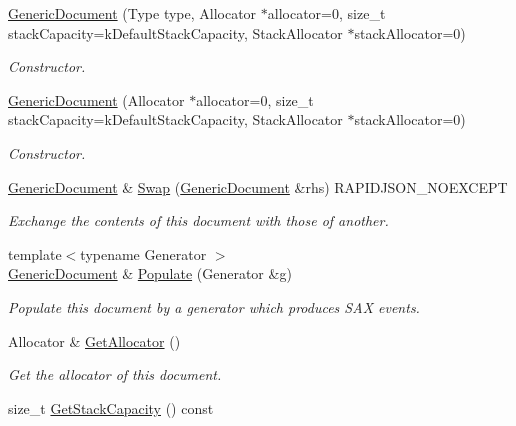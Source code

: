 \begin{DoxyCompactItemize}
\item 
\hyperlink{class_generic_document_a3da21e72ec8f26b9da77d86cc1d41cdd}{Generic\+Document} (Type type, Allocator $\ast$allocator=0, size\+\_\+t stack\+Capacity=k\+Default\+Stack\+Capacity, Stack\+Allocator $\ast$stack\+Allocator=0)
\begin{DoxyCompactList}\small\item\em Constructor. \end{DoxyCompactList}\item 
\hyperlink{class_generic_document_a6b1c313ad538cafc4d23d4bd5f97178c}{Generic\+Document} (Allocator $\ast$allocator=0, size\+\_\+t stack\+Capacity=k\+Default\+Stack\+Capacity, Stack\+Allocator $\ast$stack\+Allocator=0)
\begin{DoxyCompactList}\small\item\em Constructor. \end{DoxyCompactList}\item 
\hyperlink{class_generic_document}{Generic\+Document} \& \hyperlink{class_generic_document_a6290e1290fad74177625af5938c0c58f}{Swap} (\hyperlink{class_generic_document}{Generic\+Document} \&rhs) R\+A\+P\+I\+D\+J\+S\+O\+N\+\_\+\+N\+O\+E\+X\+C\+E\+PT
\begin{DoxyCompactList}\small\item\em Exchange the contents of this document with those of another. \end{DoxyCompactList}\item 
{\footnotesize template$<$typename Generator $>$ }\\\hyperlink{class_generic_document}{Generic\+Document} \& \hyperlink{class_generic_document_a36fbc7d0a9595d26e0d2c8859d207d1f}{Populate} (Generator \&g)
\begin{DoxyCompactList}\small\item\em Populate this document by a generator which produces S\+AX events. \end{DoxyCompactList}\item 
Allocator \& \hyperlink{class_generic_document_aa4609d6b19f86aec1a6b96edf2c27686}{Get\+Allocator} ()\hypertarget{class_generic_document_aa4609d6b19f86aec1a6b96edf2c27686}{}\label{class_generic_document_aa4609d6b19f86aec1a6b96edf2c27686}

\begin{DoxyCompactList}\small\item\em Get the allocator of this document. \end{DoxyCompactList}\item 
size\+\_\+t \hyperlink{class_generic_document_aa99f03016f4907332fcf70aadb645194}{Get\+Stack\+Capacity} () const \hypertarget{class_generic_document_aa99f03016f4907332fcf70aadb645194}{}\label{class_generic_document_aa99f03016f4907332fcf70aadb645194}


\end{DoxyCompactItemize}
